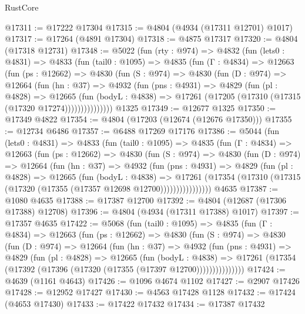 \begin{lexlean}{RustCore}
\begin{coremodule}
@17311 := @17222 @17304
@17315 := @4804 (@4934 (@17311 @12701) @1017)
@17317 := @17264 (@4891 @17304)
@17318 := @4875 @17317
@17320 := @4804 (@17318 @12731)
@17348 := @5022
    (fun (rty : @974) =>
    @4832
      (fun (lets0 : @4831) =>
      @4833
        (fun (tail0 : @1095) =>
        @4835
          (fun (Γ : @4834) =>
          @12663
            (fun (ps : @12662) =>
            @4830
              (fun (S : @974) =>
              @4830
                (fun (D : @974) =>
                @12664
                  (fun (hn : @37) =>
                  @4932
                    (fun (pns : @4931) =>
                    @4829
                      (fun (pl : @4828) =>
                      @12665
                        (fun (bodyL : @4838) =>
                        @17261 (@17205 (@17310 (@17315 (@17320 @17274)))))))))))))))
    @1325
@17349 := @12677 @1325
@17350 := @17349 @4822
@17354 := @4804 (@17203 (@12674 (@12676 @17350)))
@17355 := @12734 @6486
@17357 := @6488 @17269 @17176
@17386 := @5044
    (fun (lets0 : @4831) =>
    @4833
      (fun (tail0 : @1095) =>
      @4835
        (fun (Γ : @4834) =>
        @12663
          (fun (ps : @12662) =>
          @4830
            (fun (S : @974) =>
            @4830
              (fun (D : @974) =>
              @12664
                (fun (hn : @37) =>
                @4932
                  (fun (pns : @4931) =>
                  @4829
                    (fun (pl : @4828) =>
                    @12665
                      (fun (bodyL : @4838) =>
                      @17261
                        (@17354
                          (@17310 (@17315 (@17320 (@17355 (@17357 @12698 @12700))))))))))))))))
    @4635
@17387 := @1080 @4635
@17388 := @17387 @12700
@17392 := @4804 (@12687 (@17306 @17388) @12708)
@17396 := @4804 (@4934 (@17311 @17388) @1017)
@17397 := @17357 @4635
@17422 := @5068
    (fun (tail0 : @1095) =>
    @4835
      (fun (Γ : @4834) =>
      @12663
        (fun (ps : @12662) =>
        @4830
          (fun (S : @974) =>
          @4830
            (fun (D : @974) =>
            @12664
              (fun (hn : @37) =>
              @4932
                (fun (pns : @4931) =>
                @4829
                  (fun (pl : @4828) =>
                  @12665
                    (fun (bodyL : @4838) =>
                    @17261 (@17354 (@17392 (@17396 (@17320 (@17355 (@17397 @12700)))))))))))))))
@17424 := @4639 (@1161 @4643)
@17426 := @1096 @4674 @1102
@17427 := @2907 @17426
@17428 := @12952 @17427
@17430 := @4563 @17428 @1128
@17432 := @17424 (@4653 @17430)
@17433 := @17422 @17432
@17434 := @17387 @17432

\end{coremodule}
\end{lexlean}

